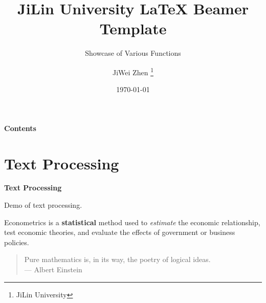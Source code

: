 \documentclass[12pt, aspectratio=169]{beamer}
\begin{document}
\title[\LaTeX{}  Beamer How to do?]{\Huge{\textbf{JiLin University \LaTeX{} Beamer Template}}}
\subtitle{Showcase of Various Functions}

\author[JiWei Zhen]{%
JiWei Zhen \thanks{\small JiLin University}
}


\date[\today]{\today}


\begin{frame}
	\titlepage 
\end{frame}


\begin{frame}{\textbf{Contents}}
	\tableofcontents 
\end{frame}


\section{Text Processing}


\linespread{1}  
\begin{frame}{\textbf{Text Processing}}
\linespread{1.5} 

	Demo of text processing.
	
	\bigskip 
	 
	\pause 
	
	 \alert{Econometrics} is a \textbf{statistical} method used to \textit{estimate} the economic relationship,
	 test economic theories, and evaluate the effects of government or business policies.
	 
	 \pause
	
	\bigskip 

	\begin{quote}
		Pure mathematics is, in its way, the poetry of logical ideas.\\
		--- Albert Einstein 
	\end{quote}
	
\end{frame}
\end{document}
